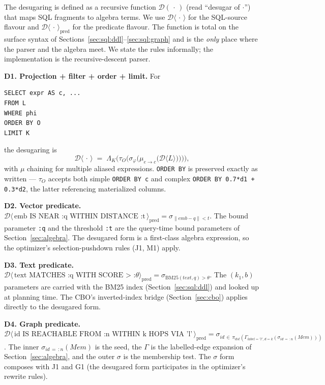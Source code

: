 \documentclass[sigconf,nonacm,review]{acmart}
\theoremstyle{plain}
\theoremstyle{definition}
\newcommand{\Mem}{\mathit{Mem}}
\theoremstyle{remark}
\begin{document}
The desugaring is defined as a recursive function
$\mathcal{D}(\,\cdot\,)$ (read ``desugar of $\cdot$'') that
maps SQL fragments to algebra terms. We use
$\mathcal{D}\!\langle\,\cdot\,\rangle$ for the SQL-source
flavour and $\mathcal{D}\!\langle\,\cdot\,\rangle_{\mathrm{pred}}$
for the predicate flavour. The function is total on the
surface syntax of
Sections~\ref{sec:sql:ddl}--\ref{sec:sql:graph} and is the
\emph{only} place where the parser and the algebra meet. We
state the rules informally; the implementation is the
recursive-descent parser.

\textbf{D1. Projection + filter + order + limit.} For
\begin{lstlisting}
SELECT expr AS c, ...
FROM L
WHERE phi
ORDER BY O
LIMIT K
\end{lstlisting}
the desugaring is
\[
\mathcal{D}\!\langle\,\cdot\,\rangle \;=\; \Lambda_K\bigl(\tau_O\bigl(\sigma_\varphi\bigl(\mu_{e \to c}\bigl(\mathcal{D}\!\langle L \rangle\bigr)\bigr)\bigr)\bigr),
\]
with $\mu$ chaining for multiple aliased expressions.
\texttt{ORDER BY} is preserved exactly as written --- $\tau_O$
accepts both simple \texttt{ORDER BY c} and complex
\texttt{ORDER BY 0.7*d1 + 0.3*d2}, the latter referencing
materialized columns.

\textbf{D2. Vector predicate.}
$\mathcal{D}\!\langle\,\text{emb IS NEAR :q WITHIN DISTANCE :t}\,\rangle_{\mathrm{pred}}
 = \sigma_{\lVert \mathit{emb} - q \rVert < t}$.
The bound parameter \texttt{:q} and the threshold \texttt{:t}
are the query-time bound parameters of
Section~\ref{sec:algebra}. The desugared form is a first-class
algebra expression, so the optimizer's selection-pushdown rules
(J1, M1) apply.

\textbf{D3. Text predicate.}
$\mathcal{D}\!\langle\,\text{text MATCHES :q WITH SCORE > :}\theta\rangle_{\mathrm{pred}}
 = \sigma_{\mathrm{BM25}(\mathit{text}, q) > \theta}$.
The $(k_1, b)$ parameters are carried with the BM25 index
(Section~\ref{sec:sql:ddl}) and looked up at planning time.
The CBO's inverted-index bridge (Section~\ref{sec:cbo}) applies
directly to the desugared form.

\textbf{D4. Graph predicate.}
$\mathcal{D}\!\langle\,\text{id IS REACHABLE FROM :n WITHIN k HOPS VIA 'l'}\,\rangle_{\mathrm{pred}}
 = \sigma_{\mathit{id} \,\in\, \pi_{\mathit{dst}}(\Gamma_{\mathit{label}='l', d=k}(\sigma_{\mathit{id}\,=\,:n}(\Mem)))}$.
The inner $\sigma_{\mathit{id}\,=\,:n}(\Mem)$ is the seed, the $\Gamma$ is
the labelled-edge expansion of Section~\ref{sec:algebra}, and
the outer $\sigma$ is the membership test. The $\sigma$ form
composes with J1 and G1 (the desugared form participates in
the optimizer's rewrite rules).
\end{document}
